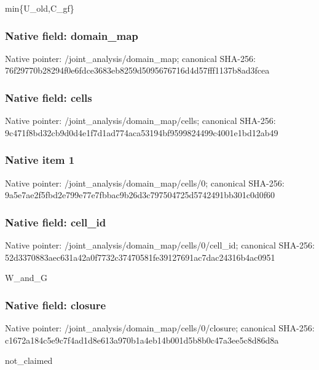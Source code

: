 \documentclass[10pt,a4paper]{article}
\begin{document}
\begingroup\raggedright\sloppy min\{U\_\allowbreak{}old,\allowbreak{}C\_\allowbreak{}gf\}\par\endgroup

\subsubsection{Native field: domain\_\allowbreak{}map}
Native pointer: /joint\_\allowbreak{}analysis/domain\_\allowbreak{}map; canonical SHA-256: 76f29770b28294f0e6fdce3683eb8259d5095676716d4d57fff1137b8ad3fcea

\subsubsection{Native field: cells}
Native pointer: /joint\_\allowbreak{}analysis/domain\_\allowbreak{}map/cells; canonical SHA-256: 9c471f8bd32cb9d0d4e1f7d1ad774aca53194bf9599824499c4001e1bd12ab49

\subsubsection{Native item 1}
Native pointer: /joint\_\allowbreak{}analysis/domain\_\allowbreak{}map/cells/0; canonical SHA-256: 9a5e7ae2f5fbd2e799e77e7fbbac9b26d3c797504725d5742491bb301c0d0f60

\subsubsection{Native field: cell\_\allowbreak{}id}
Native pointer: /joint\_\allowbreak{}analysis/domain\_\allowbreak{}map/cells/0/cell\_\allowbreak{}id; canonical SHA-256: 52d3370883aec631a42a0f7732c37470581fe39127691ac7dac24316b4ac0951

\begingroup\raggedright\sloppy W\_\allowbreak{}and\_\allowbreak{}G\par\endgroup

\subsubsection{Native field: closure}
Native pointer: /joint\_\allowbreak{}analysis/domain\_\allowbreak{}map/cells/0/closure; canonical SHA-256: c1672a184c5e9c7f4ad1d8e613a970b1a4eb14b001d5b8b0c47a3ee5c8d86d8a

\begingroup\raggedright\sloppy not\_\allowbreak{}claimed\par\endgroup
\end{document}
